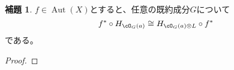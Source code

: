 \documentclass[uplatex, a4paper, dvipdfmx]{jsarticle}
\theoremstyle{definition}
\newtheorem{lemma}[theorem]{補題}
\DeclareMathOperator{\Aut}{\mathrm{Aut}}
\DeclareMathOperator{\Ext}{\mathrm{Ext}}
\DeclareMathOperator{\Coh}{\mathrm{Coh}}
\begin{document}
\begin{lemma}
    $f \in \Aut(X)$とすると、任意の既約成分$G$について
    \begin{equation}
        f^* \circ H_{\cO_G(a)} \cong H_{\cO_G(a) \otimes L}\circ f^*
    \end{equation}
    である。
\end{lemma}
\begin{proof}

\end{proof}
\end{document}
